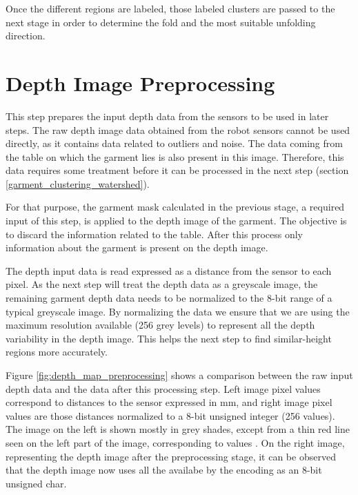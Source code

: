 Once the different regions are labeled, those labeled clusters are passed to the next stage in order to determine the fold and the most suitable unfolding direction.

\section{Depth Image Preprocessing}
\label{depth_image_preprocessing}

This step prepares the input depth data from the sensors to be used in later steps. The raw depth image data obtained from the robot sensors cannot be used directly, as it contains data related to outliers and noise. The data coming from the table on which the garment lies is also present in this image. Therefore, this data requires some treatment before it can be processed in the next step (section \ref{garment_clustering_watershed}). 

For that purpose, the garment mask calculated in the previous stage, a required input of this step, is applied to the depth image of the garment. The objective is to discard the information related to the table. After this process only information about the garment is present on the depth image.

The depth input data is read expressed as a distance from the sensor to each pixel. As the next step will treat the depth data as a greyscale image, the remaining garment depth data needs to be normalized to the 8-bit range of a typical greyscale image. By normalizing the data we ensure that we are using the maximum resolution available (256 grey levels) to represent all the depth variability in the depth image. This helps the next step to find similar-height regions more accurately.

Figure \ref{fig:depth_map_preprocessing}  shows a comparison between the raw input depth data and the data after this processing step. Left image pixel values correspond to distances to the sensor expressed in mm, and right image pixel values are those distances normalized to a 8-bit unsigned integer (256 values). The image on the left is shown mostly in grey shades, except from a thin red line seen on the left part of the image, corresponding to values . On the right image, representing the depth image after the preprocessing stage, it can be observed that the depth image now uses all the  availabe by the encoding as an 8-bit unsigned char.

